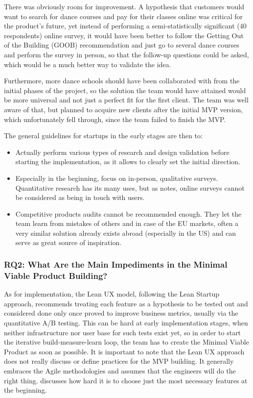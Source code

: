 \documentclass{article}
\begin{document}
There was obviously room for improvement. A hypothesis that customers would want to search for dance courses and pay for their classes online was critical for the product's future, yet instead of performing a semi-statistically significant (40 respondents) online survey, it would have been better to follow the Getting Out of the Building (GOOB) \cite{blank2013four} recommendation and just go to several dance courses and perform the survey in person, so that the follow-up questions could be asked, which would be a much better way to validate the idea.

Furthermore, more dance schools should have been collaborated with from the initial phases of the project, so the solution the team would have attained would be more universal and not just a perfect fit for the first client. The team was well aware of that, but planned to acquire new clients after the initial MVP version, which unfortunately fell through, since the team failed to finish the MVP.

The general guidelines for startups in the early stages are then to:
\begin{itemize}
\item Actually perform various types of research and design validation before starting the implementation, as it allows to clearly set the initial direction.
\item Especially in the beginning, focus on in-person, qualitative surveys. Quantitative research has its many uses, but as \cite{klein2013ux} notes, online surveys cannot be considered as being in touch with users.
\item Competitive products audits cannot be recommended enough. They let the team learn from mistakes of others and in case of the EU markets, often a very similar solution already exists abroad (especially in the US) and can serve as great source of inspiration.
\end{itemize}

\subsubsection{RQ2: What Are the Main Impediments in the Minimal Viable Product Building?}
As for implementation, the Lean UX model, following the Lean Startup approach, recommends treating each feature as a hypothesis to be tested out and considered done only once proved to improve business metrics, usually via the quantitative A/B testing. This can be hard at early implementation stages, when neither infrastructure nor user base for such tests exist yet, so in order to start the iterative build-measure-learn loop, the team has to create the Minimal Viable Product as soon as possible. It is important to note that the Lean UX approach does not really discuss or define practices for the MVP building. It generally embraces the Agile methodologies and assumes that the engineers will do the right thing. \cite{klein2013ux} discusses how hard it is to choose just the most necessary features at the beginning.
\end{document}
